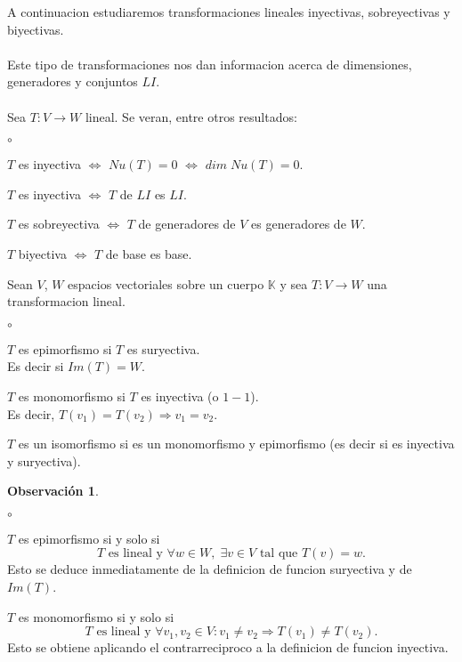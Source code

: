 \documentclass{article}
\theoremstyle{definition}
\theoremstyle{definition}
\newtheorem*{obs}{Observación}
\theoremstyle{remark}
\begin{document}
  A continuacion estudiaremos transformaciones lineales inyectivas, sobreyectivas y biyectivas. \\\\ Este tipo de transformaciones nos dan informacion acerca de dimensiones, generadores y conjuntos $LI$. \\\\ Sea $T:V \to W$ lineal. Se veran, entre otros resultados: \begin{list}{$\circ$}{}  
\item  $T$ es inyectiva $\Leftrightarrow$ $Nu(T)=0$ $\Leftrightarrow $ $dim \; Nu(T)=0$. 
\item $T$ es inyectiva $\Leftrightarrow$ $T$ de $LI$ es $LI$.
\item $T$ es sobreyectiva $\Leftrightarrow$ $T$ de generadores de $V$ es generadores de $W$. 
\item $T$ biyectiva $\Leftrightarrow$ $T$ de base es base.
\end{list}
\begin{defi}
  Sean $V$, $W$ espacios vectoriales sobre un cuerpo $\mathbb{K}$ y sea $T:V \to W$ una transformacion lineal.\begin{list}{$\circ$}{}  
\item $T$ es epimorfismo si $T$ es suryectiva.  \\
  Es decir si $Im(T)=W$.
\item $T$ es monomorfismo si $T$ es inyectiva (o $1-1$). \\
  Es decir, $T(v_1)=T(v_2)\Rightarrow v_1 = v_2$.
\item $T$ es un isomorfismo si es un monomorfismo y epimorfismo (es decir si es inyectiva y suryectiva).
\end{list}
\end{defi}
\begin{obs}\;
\begin{list}{$\circ$}{}  
\item $T$ es epimorfismo si y solo si \[
    T \text{ es lineal y }\forall w \in W, \; \exists v \in V \text{ tal que } T(v)=w. 
  \]
  Esto se deduce inmediatamente de la definicion de funcion suryectiva y de $Im(T)$.
\item $T$ es monomorfismo si y solo si \[
     T \text{ es lineal y } \forall v_1, v_2 \in V : v_1 \neq v_2 \Rightarrow T(v_1) \neq T(v_2).
  \]
  Esto se obtiene aplicando el contrarreciproco a la definicion de funcion inyectiva.
\end{list}
\end{obs} \pagebreak 
\end{document}
